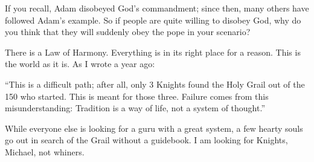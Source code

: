 \begin{footnotesize}
\begin{sffamily}
If you recall, Adam disobeyed God's commandment; since then, many others have followed Adam's example. So if people are quite willing to disobey God, why do you think that they will suddenly obey the pope in your scenario?

There is a Law of Harmony. Everything is in its right place for a reason. This is the world as it is. As I wrote a year ago:

``This is a difficult path; after all, only 3 Knights found the Holy Grail out of the 150 who started. This is meant for those three. Failure comes from this misunderstanding: Tradition is a way of life, not a system of thought.''

While everyone else is looking for a guru with a great system, a few hearty souls go out in search of the Grail without a guidebook. I am looking for Knights, Michael, not whiners.


\hfill

\end{sffamily}
\end{footnotesize}

